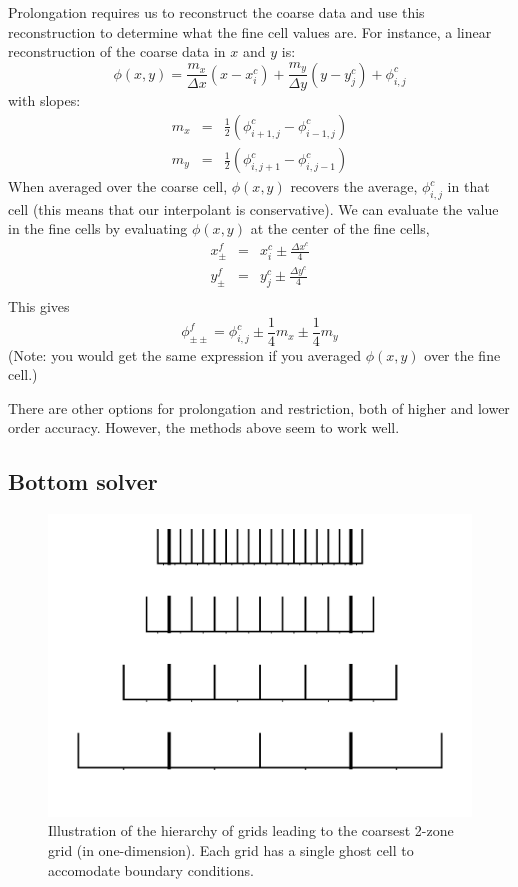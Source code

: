 Prolongation requires us to reconstruct the coarse data and use
this reconstruction to determine what the fine cell values are.  For
instance, a linear reconstruction of the coarse data in $x$ and $y$ is:
\begin{equation}
\phi(x,y) = \frac{m_x}{\Delta x} (x - x_i^c) + 
            \frac{m_y}{\Delta y} (y - y_j^c) + \phi_{i,j}^c
\end{equation}
with slopes:
\begin{eqnarray}
m_x &=& \frac{1}{2}({\phi_{i+1,j}^c - \phi_{i-1,j}^c}) \\
m_y &=& \frac{1}{2}({\phi_{i,j+1}^c - \phi_{i,j-1}^c})
\end{eqnarray}
%
When averaged over the coarse cell, $\phi(x,y)$ recovers the average,
$\phi_{i,j}^c$ in that cell (this means that our interpolant is
conservative).  We can evaluate the value in the fine cells by
evaluating $\phi(x,y)$ at the center of the fine cells,
\begin{eqnarray}
x_\pm^f &=& x_i^c \pm \frac{\Delta x^c}{4} \\
y_\pm^f &=& y_j^c \pm \frac{\Delta y^c}{4} \\
\end{eqnarray}
This gives
\begin{equation}
\phi_{\pm\pm}^f = \phi_{i,j}^c \pm \frac{1}{4}m_x \pm \frac{1}{4}m_y
\end{equation}
(Note: you would get the same expression if you averaged $\phi(x,y)$ over
the fine cell.)

There are other options for prolongation and restriction, both of
higher and lower order accuracy.  However, the methods above seem to
work well.

\subsection{Bottom solver}

\begin{figure}[t]
\centering
\includegraphics[width=5.5in]{mgtower}
\caption[A multigrid hierarchy.]{\label{fig:mgtower} Illustration of
  the hierarchy of grids leading to the coarsest 2-zone grid (in
  one-dimension).  Each grid has a single ghost cell to accomodate
  boundary conditions.}
\end{figure}

